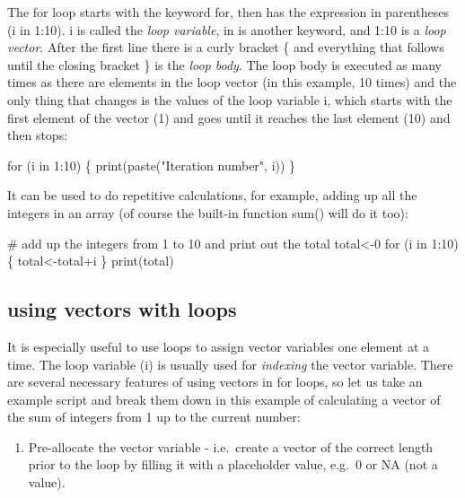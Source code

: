 \documentclass[
  letterpaper,
  DIV=11,
  numbers=noendperiod]{scrreprt}
\newenvironment{Shaded}{\begin{snugshade}}{\end{snugshade}}
\newcommand{\NormalTok}[1]{\textcolor[rgb]{0.00,0.23,0.31}{#1}}
\providecommand{\tightlist}{%
  \setlength{\itemsep}{0pt}\setlength{\parskip}{0pt}}\usepackage{longtable,booktabs,array}
\begin{document}
The for loop starts with the keyword for, then has the expression in
parentheses (i in 1:10). i is called the \emph{loop variable}, in is
another keyword, and 1:10 is a \emph{loop vector}. After the first line
there is a curly bracket \{ and everything that follows until the
closing bracket \} is the \emph{loop body}. The loop body is executed as
many times as there are elements in the loop vector (in this example, 10
times) and the only thing that changes is the values of the loop
variable i, which starts with the first element of the vector (1) and
goes until it reaches the last element (10) and then stops:

\begin{Shaded}
\begin{Highlighting}[]
\NormalTok{for (i in 1:10) \{}
\NormalTok{  print(paste("Iteration number", i))}
\NormalTok{\}}
\end{Highlighting}
\end{Shaded}

It can be used to do repetitive calculations, for example, adding up all
the integers in an array (of course the built-in function sum() will do
it too):

\begin{Shaded}
\begin{Highlighting}[]
\NormalTok{\# add up the integers from 1 to 10 and print out the total}
\NormalTok{total\textless{}{-}0}
\NormalTok{for (i in 1:10) \{}
\NormalTok{  total\textless{}{-}total+i}
\NormalTok{\}}
\NormalTok{print(total)}
\end{Highlighting}
\end{Shaded}

\hypertarget{using-vectors-with-loops}{%
\subsection*{using vectors with loops}\label{using-vectors-with-loops}}

It is especially useful to use loops to assign vector variables one
element at a time. The loop variable (i) is usually used for
\emph{indexing} the vector variable. There are several necessary
features of using vectors in for loops, so let us take an example script
and break them down in this example of calculating a vector of the sum
of integers from 1 up to the current number:

\begin{enumerate}
\def\labelenumi{\arabic{enumi})}
\tightlist
\item
  Pre-allocate the vector variable - i.e.~create a vector of the correct
  length prior to the loop by filling it with a placeholder value,
  e.g.~0 or NA (not a value).
\end{enumerate}
\end{document}
